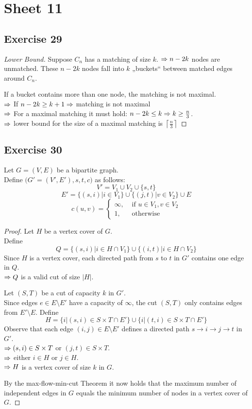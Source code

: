 \documentclass[12pt,oneside,a4paper,parskip=on,fleqn]{scrartcl}
\begin{document}
\section*{Sheet 11}


\subsection*{Exercise 29}
\begin{proof}[Lower Bound]
	Suppose $C_n$ has a matching of size $k$. $\Rightarrow n-2k$ nodes are unmatched. These $n-2k$  nodes fall into $k$ „buckets“ between matched edges around $C_n$.

	If a bucket contains more than one node, the matching is not maximal.\\
	$\Rightarrow$ If $n-2k \geq k+1 \Rightarrow$ matching is not maximal\\
	$\Rightarrow$ For a maximal matching it must hold: $n-2k\leq k \Rightarrow k\geq \frac{n}{3}$.\\
	$\Rightarrow$ lower bound for the size of a maximal matching is $\left\lceil \frac{n}{3}\right\rceil$
\end{proof}


\subsection*{Exercise 30}
Let $G=(V,E)$ be a bipartite graph.\\
Define $\bigl( G'=(V',E'),s,t,c \bigr)$ as follows:
\[
	V' = V_1 \cup V_2 \cup \{s,t\}
\]\[
	E' = \bigl\{ (s,i) | i \in V_1 \bigr\} \cup \bigl\{ (j,t) | v \in V_2 \bigr\} \cup E
\]\[
	c(u,v) = \begin{cases}
		\infty, &\text{ if } u \in V_1, v\in V_2\\
		1, &\text{ otherwise }
	\end{cases}
\]
\begin{proof}
Let $H$ be a vertex cover of $G$.\\
Define \[
	Q = \bigl\{ (s,i) | i\in H \cap V_1 \bigr\} \cup \bigl\{ (i,t) | i \in H \cap V_2 \bigr\}
\]
Since $H$ is a vertex cover, each directed path from $s$ to $t$ in $G'$ contains one edge in $Q$.\\
$\Rightarrow Q$ is a valid cut of size $|H|$.

Let $(S,T)$ be a cut of capacity $k$ in $G'$.\\
Since edges $e\in E\setminus E'$ have a capacity of $\infty$, the cut $(S,T)$ only contains edges from $E'\setminus E$.
Define \[
	H = \bigl\{ i | (s,i) \in S\times T \cap E' \bigr\} \cup \bigl\{ i | (t,i) \in S\times  T \cap E' \bigr\}
\]
Observe that each edge $(i,j) \in E\setminus E'$ defines a directed path $s\to i\to j\to t$ in $G'$.\\
$\Rightarrow (s,i) \in S\times T$ or $(j,t) \in S\times T$.\\
$\Rightarrow$ either $i\in H$ or $j \in H$.\\
$\Rightarrow H$ is a vertex cover of size $k$ in $G$.

By the max-flow-min-cut Theorem it now holds that the maximum number of independent edges in $G$ equals the minimum number of nodes in a vertex cover of $G$.
\end{proof}
\end{document}
